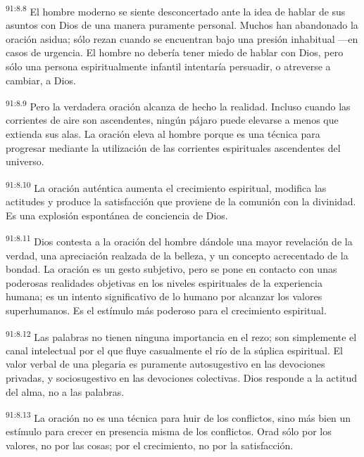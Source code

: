 \par
\textsuperscript{91:8.8} El hombre moderno se siente desconcertado ante la idea de hablar de sus asuntos con Dios de una manera puramente personal. Muchos han abandonado la oración asidua; sólo rezan cuando se encuentran bajo una presión inhabitual ---en casos de urgencia. El hombre no debería tener miedo de hablar con Dios, pero sólo una persona espiritualmente infantil intentaría persuadir, o atreverse a cambiar, a Dios.

\par
\textsuperscript{91:8.9} Pero la verdadera oración alcanza de hecho la realidad. Incluso cuando las corrientes de aire son ascendentes, ningún pájaro puede elevarse a menos que extienda sus alas. La oración eleva al hombre porque es una técnica para progresar mediante la utilización de las corrientes espirituales ascendentes del universo.

\par
\textsuperscript{91:8.10} La oración auténtica aumenta el crecimiento espiritual, modifica las actitudes y produce la satisfacción que proviene de la comunión con la divinidad. Es una explosión espontánea de conciencia de Dios.

\par
\textsuperscript{91:8.11} Dios contesta a la oración del hombre dándole una mayor revelación de la verdad, una apreciación realzada de la belleza, y un concepto acrecentado de la bondad. La oración es un gesto subjetivo, pero se pone en contacto con unas poderosas realidades objetivas en los niveles espirituales de la experiencia humana; es un intento significativo de lo humano por alcanzar los valores superhumanos. Es el estímulo más poderoso para el crecimiento espiritual.

\par
\textsuperscript{91:8.12} Las palabras no tienen ninguna importancia en el rezo; son simplemente el canal intelectual por el que fluye casualmente el río de la súplica espiritual. El valor verbal de una plegaria es puramente autosugestivo en las devociones privadas, y sociosugestivo en las devociones colectivas. Dios responde a la actitud del alma, no a las palabras.

\par
\textsuperscript{91:8.13} La oración no es una técnica para huir de los conflictos, sino más bien un estímulo para crecer en presencia misma de los conflictos. Orad sólo por los valores, no por las cosas; por el crecimiento, no por la satisfacción.

